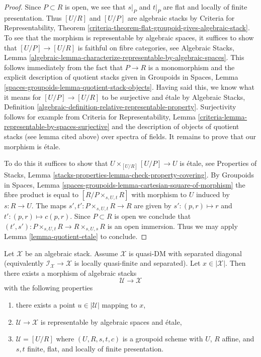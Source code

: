 \begin{proof}
Since $P \subset R$ is open, we see that $s|_P$ and $t|_P$
are flat and locally of finite presentation.
Thus $[U/R]$ and $[U/P]$ are algebraic stacks by
Criteria for Representability, Theorem
\ref{criteria-theorem-flat-groupoid-gives-algebraic-stack}.
To see that the morphism is representable by algebraic spaces,
it suffices to show that $[U/P] \to [U/R]$ is faithful on
fibre categories, see
Algebraic Stacks, Lemma
\ref{algebraic-lemma-characterize-representable-by-algebraic-spaces}.
This follows immediately from the fact that $P \to R$ is a monomorphism
and the explicit description of quotient stacks given in
Groupoids in Spaces, Lemma
\ref{spaces-groupoids-lemma-quotient-stack-objects}.
Having said this, we know what it means for
$[U/P] \to [U/R]$ to be surjective and \'etale by
Algebraic Stacks, Definition
\ref{algebraic-definition-relative-representable-property}.
Surjectivity follows for example from
Criteria for Representability,
Lemma \ref{criteria-lemma-representable-by-spaces-surjective}
and the description of objects of quotient stacks
(see lemma cited above) over spectra of fields.
It remains to prove that our morphism is \'etale.

\medskip\noindent
To do this it suffices to show that $U \times_{[U/R]} [U/P] \to U$
is \'etale, see Properties of Stacks, Lemma
\ref{stacks-properties-lemma-check-property-covering}.
By Groupoids in Spaces, Lemma
\ref{spaces-groupoids-lemma-cartesian-square-of-morphism}
the fibre product is equal to $[R/P \times_{s, U, t} R]$
with morphism to $U$ induced by $s : R \to U$.
The maps $s', t' : P \times_{s, U, t} R \to R$ are given by
$s' : (p, r) \mapsto r$ and $t' : (p, r) \mapsto c(p, r)$. Since
$P \subset R$ is open we conclude that
$(t', s') : P \times_{s, U, t} R \to R \times_{s, U, s} R$
is an open immersion.
Thus we may apply Lemma \ref{lemma-quotient-etale}
to conclude.
\end{proof}

\begin{lemma}
\label{lemma-etale-local-quasi-DM}
Let $\mathcal{X}$ be an algebraic stack. Assume $\mathcal{X}$ is
quasi-DM with separated diagonal (equivalently
$\mathcal{I}_\mathcal{X} \to \mathcal{X}$ is locally quasi-finite and
separated). Let $x \in |\mathcal{X}|$. Then there exists a
morphism of algebraic stacks
$$
\mathcal{U} \longrightarrow \mathcal{X}
$$
with the following properties
\begin{enumerate}
\item there exists a point $u \in |\mathcal{U}|$ mapping to $x$,
\item $\mathcal{U} \to \mathcal{X}$ is representable by algebraic spaces and
\'etale,
\item $\mathcal{U} = [U/R]$ where $(U, R, s, t, c)$ is a groupoid
scheme with $U$, $R$ affine, and $s, t$ finite, flat, and
locally of finite presentation.
\end{enumerate}
\end{lemma}

